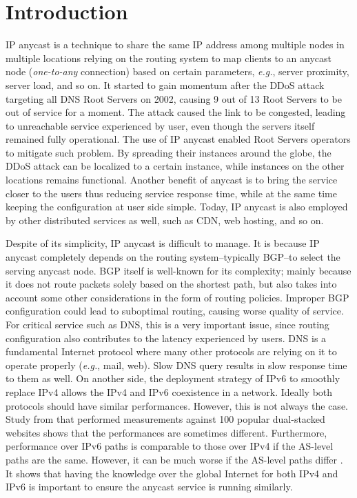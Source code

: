\chapter{Introduction}
\label{ch01:intro}

IP anycast \cite{rfc1546} is a technique to share the same IP address among multiple nodes in multiple locations relying on the routing system to map clients to an anycast node (\textit{one-to-any} connection) based on certain parameters, \textit{e.g.}, server proximity, server load, and so on. It started to gain momentum after the DDoS attack targeting all DNS Root Servers on 2002, causing 9 out of 13 Root Servers to be out of service for a moment. The attack caused the link to be congested, leading to unreachable service experienced by user, even though the servers itself remained fully operational. The use of IP anycast enabled Root Servers operators to mitigate such problem. By spreading their instances around the globe, the DDoS attack can be localized to a certain instance, while instances on the other locations remains functional. Another benefit of anycast is to bring the service closer to the users thus reducing service response time, while at the same time keeping the configuration at user side simple. Today, IP anycast is also employed by other distributed services as well, such as CDN, web hosting, and so on.

Despite of its simplicity, IP anycast is difficult to manage. It is because IP anycast completely depends on the routing system--typically BGP--to select the serving anycast node. BGP itself is well-known for its complexity; mainly because it does not route packets solely based on the shortest path, but also takes into account some other considerations in the form of routing policies. Improper BGP configuration could lead to suboptimal routing, causing worse quality of service. For critical service such as DNS, this is a very important issue, since routing configuration also contributes to the latency experienced by users. DNS is a fundamental Internet protocol where many other protocols are relying on it to operate properly (\textit{e.g.}, mail, web). Slow DNS query results in slow response time to them as well. On another side, the deployment strategy of IPv6 to smoothly replace IPv4 allows the IPv4 and IPv6 coexistence in a network. Ideally both protocols should have similar performances. However, this is not always the case. Study from \cite{7145323} that performed measurements against 100 popular dual-stacked websites shows that the performances are sometimes different. Furthermore, performance over IPv6 paths is comparable to those over IPv4 if the AS-level paths are the same. However, it can be much worse if the AS-level paths differ \cite{Dhamdhere:2012:MDI:2398776.2398832}. It shows that having the knowledge over the global Internet for both IPv4 and IPv6 is important to ensure the anycast service is running similarly.

